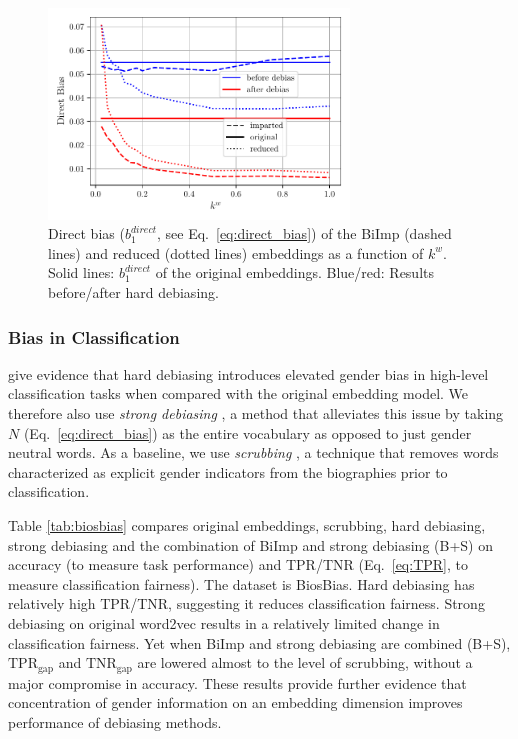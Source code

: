 \documentclass[11pt,a4paper]{article}
\def\proposedmethod{BiImp}
\begin{document}
\begin{figure}
	\centering
	\includegraphics[width=8.0cm]{Figures/gender_bias_reduction.pdf}
	\caption{Direct bias
          ($b^{direct}_1$, see Eq.\ \ref{eq:direct_bias})
of the \proposedmethod{}
          (dashed lines) and reduced 
          (dotted lines) embeddings as a function of $k^w$. Solid lines:
          $b^{direct}_1$
 of the original embeddings. Blue/red: Results before/after
 hard debiasing.}
	\label{fig:bias}
\end{figure}

\subsubsection{Bias in Classification}

\citet{prost19biasTextClassif} give evidence that hard debiasing  introduces elevated
gender bias in high-level classification tasks when compared
with the original embedding model.
We therefore also use 
\textit{strong debiasing} \citep{prost19biasTextClassif},
a method that alleviates this issue
by taking $N$ (Eq.\ \eqref{eq:direct_bias}) as the entire
vocabulary as opposed to just gender neutral words.
As a baseline, we use \emph{scrubbing}
\citep{de19biosbias}, a technique that removes words characterized as
explicit gender indicators from the biographies prior to
classification.

Table \ref{tab:biosbias} compares
original embeddings, scrubbing, hard debiasing, strong
debiasing and the combination of \proposedmethod{} and
strong debiasing (B+S) on accuracy
(to measure task performance)
and TPR/TNR (Eq.\ \ref{eq:TPR}, to measure classification fairness).
The dataset is BiosBias.
Hard debiasing
has relatively high TPR/TNR, suggesting it
reduces classification fairness.
Strong debiasing 
on  original word2vec results in a relatively limited
change in classification fairness. Yet when
\proposedmethod{} and
strong debiasing are combined
(B+S),
$\text{TPR}_{\text{gap}}$ and $\text{TNR}_{\text{gap}}$
are lowered almost to the level of scrubbing,
without a major compromise in accuracy. These results
provide further evidence that concentration of gender
information on an embedding dimension improves performance
of debiasing methods.
\end{document}
